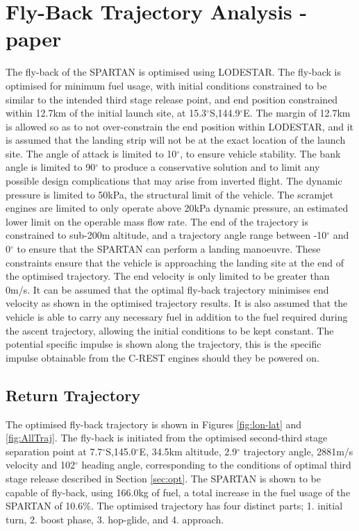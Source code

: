 \section{Fly-Back Trajectory Analysis - paper}
The fly-back of the SPARTAN is optimised using LODESTAR. The fly-back is optimised for minimum fuel usage, with initial conditions constrained to be similar to the intended third stage release point, and end position constrained within 12.7km of the initial launch site, at  15.3$^\circ$S,144.9$^\circ$E\cite{ForbesSpyratos2018}. The margin of 12.7km is allowed so as to not over-constrain the end position within LODESTAR, and it is assumed that the landing strip will not be at the exact location of the launch site. The angle of attack is limited to 10$^\circ$, to ensure vehicle stability. The bank angle is limited to 90$^\circ$ to produce a conservative solution and to limit any possible design complications that may arise from inverted flight. The dynamic pressure is limited to 50kPa, the structural limit of the vehicle. The scramjet engines are limited to only operate above 20kPa dynamic pressure, an estimated lower limit on the operable mass flow rate.
The end of the trajectory is constrained to sub-200m altitude, and a trajectory angle range between -10$^\circ$ and 0$^\circ$ to ensure that the SPARTAN can perform a landing manoeuvre. These constraints ensure that the vehicle is approaching the landing site at the end of the optimised trajectory. The end velocity is only limited to be greater than 0m/s. It can be assumed that the optimal fly-back trajectory minimises end velocity as shown in the optimised trajectory results. 
It is also assumed that the vehicle is able to carry any necessary fuel in addition to the fuel required during the ascent trajectory, allowing the initial conditions to be kept constant. The potential specific impulse is shown along the trajectory, this is the specific impulse obtainable from the C-REST engines should they be powered on.




\subsection{Return Trajectory}


The optimised fly-back trajectory is shown in Figures \ref{fig:lon-lat} and \ref{fig:AllTraj}.
The fly-back is initiated from the optimised second-third stage separation point at 7.7$^\circ$S,145.0$^\circ$E, 34.5km altitude, 2.9$^\circ$ trajectory angle, 2881m/s velocity and 102$^\circ$ heading angle, corresponding to the conditions of optimal third stage release described in Section \ref*{sec:opt}. 
The SPARTAN is shown to be capable of fly-back, using 166.0kg of fuel, a total increase in the fuel usage of the SPARTAN of 10.6\%.
The optimised trajectory has four distinct parts; 1. initial turn, 2. boost phase, 3. hop-glide, and 4. approach. 

